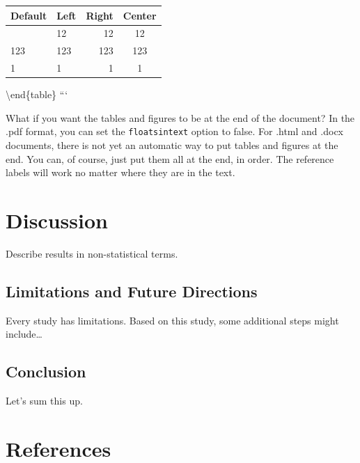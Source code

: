 \documentclass[
  man,
  colorlinks=true,linkcolor=blue,citecolor=blue,urlcolor=blue]{apa7}
\begin{document}
\begin{table}
\caption{Figure caption of a markdown table}
\label{apatb-mymarkdowntable}

\begin{longtable}[]{@{}llrc@{}}
\toprule\noalign{}
Default & Left & Right & Center \\
\midrule\noalign{}
\endhead
\bottomrule\noalign{}
\endlastfoot
12 & 12 & 12 & 12 \\
123 & 123 & 123 & 123 \\
1 & 1 & 1 & 1 \\
\end{longtable}


\textbackslash end\{table\} ```

What if you want the tables and figures to be at the end of the
document? In the .pdf format, you can set the \texttt{floatsintext}
option to false. For .html and .docx documents, there is not yet an
automatic way to put tables and figures at the end. You can, of course,
just put them all at the end, in order. The reference labels will work
no matter where they are in the text.

\hypertarget{discussion}{%
\section{Discussion}\label{discussion}}

Describe results in non-statistical terms.

\hypertarget{limitations-and-future-directions}{%
\subsection{Limitations and Future
Directions}\label{limitations-and-future-directions}}

Every study has limitations. Based on this study, some additional steps
might include\ldots{}

\hypertarget{conclusion}{%
\subsection{Conclusion}\label{conclusion}}

Let's sum this up.

\newpage{}

\hypertarget{references}{%
\section{References}\label{references}}


\end{table}
\end{document}
